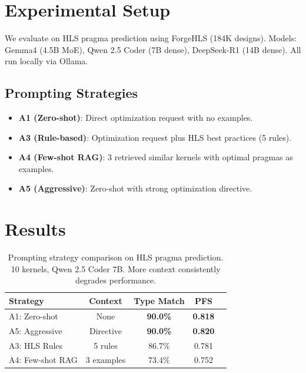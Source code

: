 \documentclass[11pt]{article}
\begin{document}
\section{Experimental Setup}

We evaluate on HLS pragma prediction using ForgeHLS (184K designs).
Models: Gemma4 (4.5B MoE), Qwen 2.5 Coder (7B dense), DeepSeek-R1
(14B dense). All run locally via Ollama.

\subsection{Prompting Strategies}

\begin{itemize}
    \item \textbf{A1 (Zero-shot)}: Direct optimization request with
    no examples.
    \item \textbf{A3 (Rule-based)}: Optimization request plus HLS
    best practices (5 rules).
    \item \textbf{A4 (Few-shot RAG)}: 3 retrieved similar kernels
    with optimal pragmas as examples.
    \item \textbf{A5 (Aggressive)}: Zero-shot with strong optimization
    directive.
\end{itemize}

\section{Results}

\begin{table}[t]
\centering
\caption{Prompting strategy comparison on HLS pragma prediction.
10 kernels, Qwen 2.5 Coder 7B. More context consistently degrades
performance.}
\label{tab:main}
\begin{tabular}{lcccc}
\toprule
\textbf{Strategy} & \textbf{Context} & \textbf{Type Match} & \textbf{PFS} \\
\midrule
A1: Zero-shot      & None      & \textbf{90.0\%} & \textbf{0.818} \\
A5: Aggressive      & Directive & \textbf{90.0\%} & \textbf{0.820} \\
A3: HLS Rules       & 5 rules   & 86.7\%          & 0.781 \\
A4: Few-shot RAG    & 3 examples & 73.4\%          & 0.752 \\
\bottomrule
\end{tabular}
\end{table}
\end{document}
